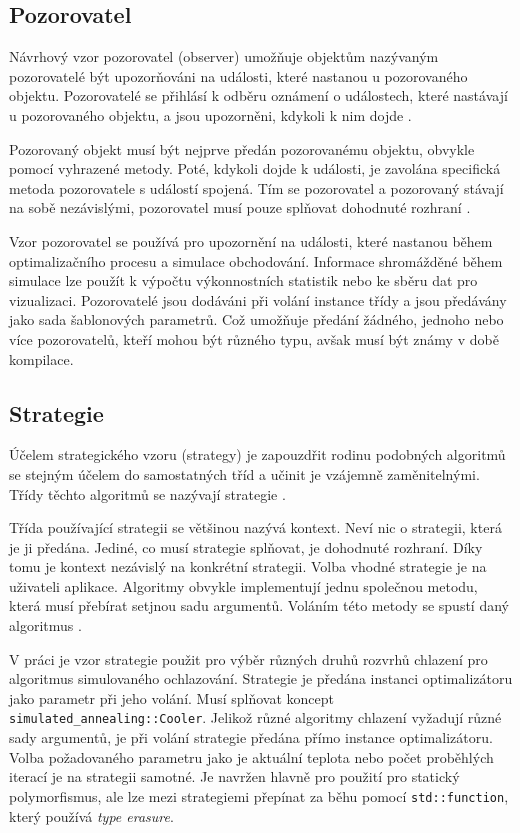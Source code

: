 \subsection{Pozorovatel}
Návrhový vzor pozorovatel (observer) umožňuje objektům nazývaným pozorovatelé být upozorňováni na události, které nastanou u pozorovaného objektu.
Pozorovatelé se přihlásí k odběru oznámení o událostech, které nastávají u pozorovaného objektu, a jsou upozorněni, kdykoli k nim dojde \cite{observer}.

Pozorovaný objekt musí být nejprve předán pozorovanému objektu, obvykle pomocí vyhrazené metody.
Poté, kdykoli dojde k události, je zavolána specifická metoda pozorovatele s událostí spojená.
Tím se pozorovatel a pozorovaný stávají na sobě nezávislými, pozorovatel musí pouze splňovat dohodnuté rozhraní \cite{observer}.

Vzor pozorovatel se používá pro upozornění na události, které nastanou během optimalizačního procesu a simulace obchodování.
Informace shromážděné během simulace lze použít k výpočtu výkonnostních statistik nebo ke sběru dat pro vizualizaci.
Pozorovatelé jsou dodáváni při volání instance třídy a jsou předávány jako sada šablonových parametrů.
Což umožňuje předání žádného, jednoho nebo více pozorovatelů, kteří mohou být různého typu, avšak musí být známy v době kompilace.

\subsection{Strategie}
Účelem strategického vzoru (strategy) je zapouzdřit rodinu podobných algoritmů se stejným účelem do samostatných tříd a učinit je vzájemně zaměnitelnými.
Třídy těchto algoritmů se nazývají strategie \cite{strategy}.

Třída používající strategii se většinou nazývá kontext.
Neví nic o strategii, která je ji předána.
Jediné, co musí strategie splňovat, je dohodnuté rozhraní.
Díky tomu je kontext nezávislý na konkrétní strategii.
Volba vhodné strategie je na uživateli aplikace.
Algoritmy obvykle implementují jednu společnou metodu, která musí přebírat setjnou sadu argumentů.
Voláním této metody se spustí daný algoritmus \cite{strategy}.

V práci je vzor strategie použit pro výběr různých druhů rozvrhů chlazení pro algoritmus simulovaného ochlazování.
Strategie je předána instanci optimalizátoru jako parametr při jeho volání.
Musí splňovat koncept \texttt{simulated\_annealing::Cooler}.
Jelikož různé algoritmy chlazení vyžadují různé sady argumentů, je při volání strategie předána přímo instance optimalizátoru.
Volba požadovaného parametru jako je aktuální teplota nebo počet proběhlých iterací je na strategii samotné.
Je navržen hlavně pro použití pro statický polymorfismus, ale lze mezi strategiemi přepínat za běhu pomocí \texttt{std::function}, který používá \textit{type erasure}.

